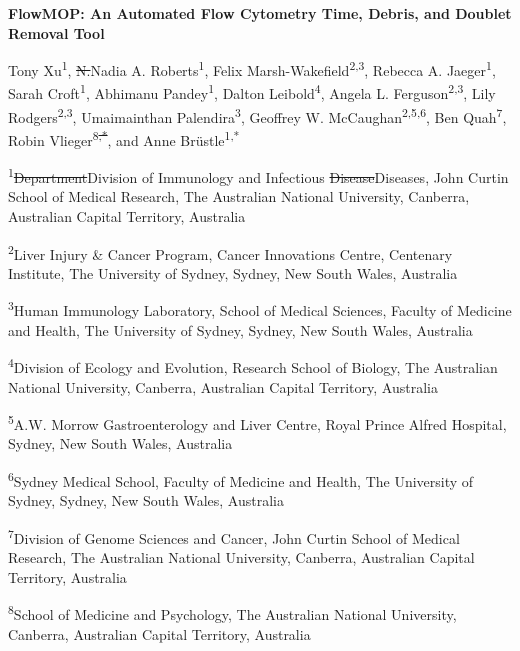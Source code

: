 \documentclass[ASNA]{latex/wiley/USG}
\begin{document}
\pagestyle{plain}
\setlength{\parindent}{0pt}
\setlength{\parskip}{\baselineskip}
\raggedbottom

\newcommand{\aff}[1]{\textsuperscript{#1}}
\begin{center}
{\LARGE\bfseries FlowMOP: An Automated Flow Cytometry Time, Debris, and
Doublet Removal Tool\par}
\vspace{1em}
{\normalsize
Tony Xu\aff{1},
\textcolor{revisionred}{\sout{N.}}\textcolor{revisionblue}{Nadia} A. Roberts\aff{1},
Felix Marsh-Wakefield\aff{2,3},
Rebecca A. Jaeger\aff{1},
Sarah Croft\aff{1},
Abhimanu Pandey\aff{1},
Dalton Leibold\aff{4},
Angela L. Ferguson\aff{2,3},
Lily Rodgers\aff{2,3},
Umaimainthan Palendira\aff{3},
Geoffrey W. McCaughan\aff{2,5,6},
Ben Quah\aff{7},
Robin Vlieger\aff{8\textcolor{revisionred}{\sout{,*}}}, and
Anne Brüstle\aff{1,*}\par}
\vspace{0.8em}
{\small
\textsuperscript{1}\textcolor{revisionred}{\sout{Department}}\textcolor{revisionblue}{Division} of Immunology and Infectious \textcolor{revisionred}{\sout{Disease}}\textcolor{revisionblue}{Diseases}, John Curtin School of Medical Research, The Australian National University, Canberra, Australian Capital Territory, Australia\par
\textsuperscript{2}Liver Injury \& Cancer Program, Cancer Innovations Centre, Centenary Institute, The University of Sydney, Sydney, New South Wales, Australia\par
\textsuperscript{3}Human Immunology Laboratory, School of Medical Sciences, Faculty of Medicine and Health, The University of Sydney, Sydney, New South Wales, Australia\par
\textsuperscript{4}Division of Ecology and Evolution, Research School of Biology, The Australian National University, Canberra, Australian Capital Territory, Australia\par
\textsuperscript{5}A.W. Morrow Gastroenterology and Liver Centre, Royal Prince Alfred Hospital, Sydney, New South Wales, Australia\par
\textsuperscript{6}Sydney Medical School, Faculty of Medicine and Health, The University of Sydney, Sydney, New South Wales, Australia\par
\textsuperscript{7}Division of Genome Sciences and Cancer, John Curtin School of Medical Research, The Australian National University, Canberra, Australian Capital Territory, Australia\par
\textsuperscript{8}School of Medicine and Psychology, The Australian National University, Canberra, Australian Capital Territory, Australia\par}
\end{center}
\end{document}
